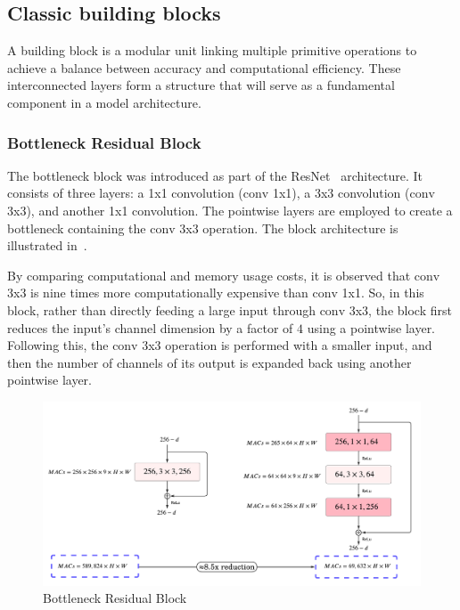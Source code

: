     
    \subsection{Classic building blocks}
    
        A building block is a modular unit linking multiple primitive operations to achieve a balance between accuracy and computational efficiency. These interconnected layers form a structure that will serve as a fundamental component in a model architecture.
    
    
        \subsubsection{Bottleneck Residual Block}
            
            The bottleneck block was introduced as part of the ResNet~\cite{resnet50} architecture. It consists of three layers: a 1x1 convolution ($\text{conv}$ 1x1), a 3x3 convolution ($\text{conv}$ 3x3), and another 1x1 convolution. The pointwise layers are employed to create a bottleneck containing the $\text{conv}$ 3x3 operation. The block architecture is illustrated in~.
            
            By comparing computational and memory usage costs, it is observed that $\text{conv}$ 3x3 is nine times more computationally expensive than $\text{conv}$ 1x1. So, in this block, rather than directly feeding a large input through $\text{conv}$ 3x3, the block first reduces the input's channel dimension by a factor of $4$ using a pointwise layer. Following this, the $\text{conv}$ 3x3 operation is performed with a smaller input, and then the number of channels of its output is expanded back using another pointwise layer.

            
            \begin{figure}[hbt!]
                \begin{center}
                \includegraphics[width=.9\textwidth]{assets/images/bottleneck.png}
                \end{center}
                \caption{Bottleneck Residual Block}%
                \label{fig:hw-nas:dl:bottleneck}
            \end{figure}
    


